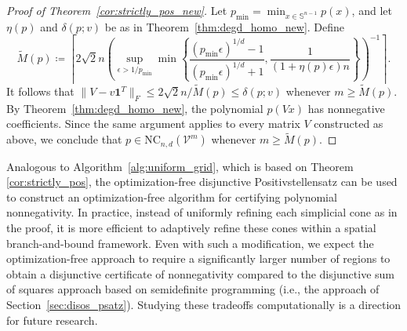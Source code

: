 \documentclass[12pt]{article}
\newcommand{\DiSOSL}{\text{NC}}
\newcommand{\defeq}{\coloneq}
\newcommand{\mbS}{\mathbb{S}}
\newcommand{\mcV}{\mathcal{V}}
\theoremstyle{remark}
\newtheorem{remark}{Remark}%
\begin{document}
\begin{proof}[Proof of Theorem~\ref{cor:strictly_pos_new}]
Let $p_{\min}=\min_{x\in\mbS^{n-1}}p(x)$, and let $\eta(p)$ and $\delta(p;v)$ be as in Theorem~\ref{thm:degd_homo_new}. Define
\[\tilde{M}(p)\defeq \left\lceil2\sqrt{2}n\left(\sup_{\epsilon>1/p_{\min}}\min\left\{\frac{(p_{\min}\epsilon)^{1/d}-1}{( p_{\min}\epsilon)^{1/d}+1},\frac{1}{(1+\eta(p)\epsilon)n}\right\}\right)^{-1}\right\rceil.\]
It follows that $\|V-v\mathbf{1}^T\|_F\le 2\sqrt{2}n/\tilde{M}(p)
\le \delta(p;v)$ whenever $m\ge \tilde{M}(p)$. By Theorem~\ref{thm:degd_homo_new}, the polynomial $p(Vx)$ has nonnegative coefficients. Since the same argument applies to every matrix $V$ constructed as above, we conclude that $p\in \DiSOSL_{n,d}(\mcV^{m})$ whenever $m\ge \tilde{M}(p)$. 
\end{proof}


Analogous to Algorithm~\ref{alg:uniform_grid}, which is based on Theorem \ref{cor:strictly_pos}, the optimization-free disjunctive Positivstellensatz can be used to construct 
an optimization-free algorithm for certifying polynomial nonnegativity. In practice, instead of uniformly refining each simplicial cone as in the proof, it is more efficient to adaptively refine these cones within a spatial branch-and-bound framework. Even with such a modification, we expect the optimization-free approach to require a significantly larger number of regions to obtain a disjunctive certificate of nonnegativity compared to the disjunctive sum of squares approach based on semidefinite programming (i.e., the approach of Section~\ref{sec:disos_psatz}). Studying these tradeoffs computationally is a direction for future research.

\end{document}
